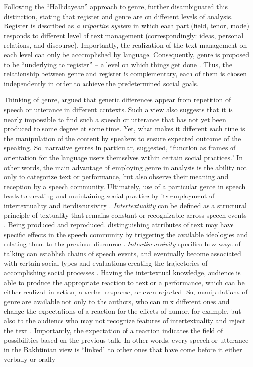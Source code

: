 \documentclass[12pt]{article}
\begin{document}
Following the ``Hallidayean'' approach to genre, \textcite{swales1990} further disambiguated this distinction, stating that register and genre are on different levels of analysis. Register is described as \textit{a tripartite system} in which each part (field, tenor, mode) responds to different level of text management (correspondingly: ideas, personal relations, and discourse). Importantly, the realization of the text management on each level can only be accomplished by language. Consequently, genre is proposed to be ``underlying to register'' -- a level on which things get done \parencite[p. 40]{swales1990}. Thus, the relationship between genre and register is complementary, each of them is chosen independently in order to achieve the predetermined social goals.

Thinking of genre, \textcite{bakhtin1984} argued that generic differences appear from repetition of speech or utterance in different contexts. Such a view also suggests that it is nearly impossible to find such a speech or utterance that has not yet been produced to some degree at some time. Yet, what makes it different each time is the manipulation of the content by speakers to ensure expected outcome of the speaking. So, narrative genres in particular, \textcite[p. 181]{hyvarinen2015} suggested, ``function as frames of orientation for the language users themselves within certain social practices.'' In other words, the main advantage of employing genre in analysis is the ability not only to categorize text or performance, but also observe their meaning and reception by a speech community. Ultimately, use of a particular genre in speech leads to creating and maintaining social practice by its employment of intertextuality \parencite{briggs1992} and iterdiscursivity \parencite{wortham2015}. \textit{Intertextuality} can be defined as a structural principle of textuality that remains constant or recognizable across speech events \parencite{wortham2015}. Being produced and reproduced, distinguishing attributes of text may have specific effects in the speech community by triggering the available ideologies and relating them to the previous discourse \parencite{bakhtin1986}. \textit{Interdiscursivity} specifies how ways of talking can establish chains of speech events, and eventually become associated with certain social types and evaluations creating the trajectories of accomplishing social processes \parencite{agha2003}. Having the intertextual knowledge, audience is able to produce the appropriate reaction to text or a performance, which can be either realized in action, a verbal response, or even rejected. So, manipulations of genre are available not only to the authors, who can mix different ones and change the expectations of a reaction for the effects of humor, for example, but also to the audience who may not recognize features of intertextuality and reject the text \parencite{bax2011}. Importantly, the expectation of a reaction indicates the field of possibilities based on the previous talk. In other words, every speech or utterance in the Bakhtinian view is ``linked'' to other ones that have come before it either verbally or orally \parencite[p. 69]{bakhtin1986}
\end{document}

